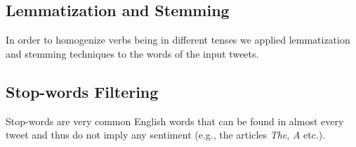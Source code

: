 \subsection{Lemmatization and Stemming}
In order to homogenize verbs being in different tenses we applied lemmatization and stemming techniques to the words of the input tweets.

\subsection{Stop-words Filtering}

Stop-words are very common English words that can be found in almost every tweet and thus do not imply any sentiment (e.g., the articles \textit{The}, \textit{A} etc.).